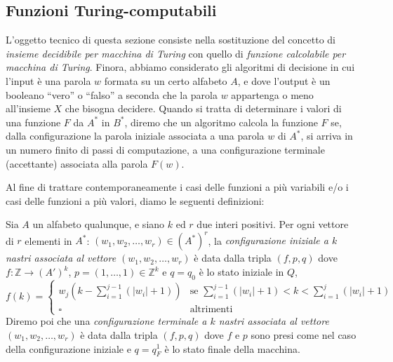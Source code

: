 \subsection{Funzioni Turing-computabili}

\medskip

L'oggetto tecnico di questa sezione consiste nella sostituzione del concetto di \emph{insieme decidibile per macchina di Turing} con quello di \emph{funzione calcolabile per macchina di Turing}. Finora, abbiamo considerato gli algoritmi di decisione in cui l'input è una parola $w$ formata su un certo alfabeto $A$, e dove l'output è un booleano ``vero'' o ``falso'' a seconda che la parola $w$ appartenga o meno all'insieme $X$ che bisogna decidere. Quando si tratta di determinare i valori di una funzione $F$ da $A^*$ in $B^*$, diremo che un algoritmo calcola la funzione $F$ se, dalla configurazione la parola iniziale associata a una parola $w$ di $A^*$, si arriva in un numero finito di passi di computazione, a una configurazione terminale (accettante) associata alla parola $F(w)$.

Al fine di trattare contemporaneamente i casi delle funzioni a più variabili e/o i casi delle funzioni a più valori, diamo le seguenti definizioni:

\begin{defi}
Sia $A$ un alfabeto qualunque, e siano $k$ ed $r$ due interi positivi. 
Per ogni vettore di $r$ elementi in $A^*$: $(w_1,w_2,\dots,w_r)\in (A^*)^r$, 
la 
\textit{configurazione iniziale a $k$ nastri associata al vettore 
$(w_1,w_2,\dots,w_r)$} 
è data dalla tripla $(f,p,q)$ dove $f\colon \mathbb Z\to (A')^k$, $p=(1,\dots,1)\in\mathbb Z^k$ e $q=q_0$ è lo stato iniziale in $Q$,
\[
f(k)=
\begin{cases}
w_j\!\left(k-\displaystyle\sum_{i=1}^{j-1}(|w_i|+1)\right) & \text{se } \displaystyle\sum_{i=1}^{j-1}(|w_i|+1)<k<\displaystyle\sum_{i=1}^{j}(|w_i|+1)\\[2ex]
\square & \text{altrimenti}
\end{cases}
\]
Diremo poi che una 
\textit{configurazione terminale a $k$ nastri associata 
al vettore $(w_1,w_2,\dots,w_r)$} è
data dalla tripla $(f,p,q)$ dove $f$ e $p$ sono presi come nel caso della configurazione iniziale e $q=q_F^1$ è lo stato finale della macchina.
\end{defi}


